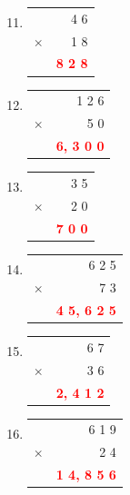 \documentclass[11pt, a4paper]{article}
\newcommand{\answerline}[1]{\textcolor{red}{\textbf{#1}}}
\begin{document}
\begin{enumerate}[label=\arabic*.]
    \setcounter{enumi}{10}
    \item \begin{tabular}[t]{c r}
          & 4 6 \\
        $\times$ & 1 8 \\ \hline
          & \answerline{8 2 8} \\ \hline
    \end{tabular}
    \hfill
    \setcounter{enumi}{15}
    \item \begin{tabular}[t]{c r}
          & 1 2 6 \\
        $\times$ & 5 0 \\ \hline
          & \answerline{6, 3 0 0} \\ \hline
    \end{tabular}

    \vspace{1.5cm}
    \setcounter{enumi}{11}
    \item \begin{tabular}[t]{c r}
          & 3 5 \\
        $\times$ & 2 0 \\ \hline
          & \answerline{7 0 0} \\ \hline
    \end{tabular}
    \hfill
    \setcounter{enumi}{16}
    \item \begin{tabular}[t]{c r}
          & 6 2 5 \\
        $\times$ & 7 3 \\ \hline
          & \answerline{4 5, 6 2 5} \\ \hline
    \end{tabular}

    \vspace{1.5cm}
    \setcounter{enumi}{12}
    \item \begin{tabular}[t]{c r}
          & 6 7 \\
        $\times$ & 3 6 \\ \hline
          & \answerline{2, 4 1 2} \\ \hline
    \end{tabular}
    \hfill
    \setcounter{enumi}{17}
    \item \begin{tabular}[t]{c r}
          & 6 1 9 \\
        $\times$ & 2 4 \\ \hline
          & \answerline{1 4, 8 5 6} \\ \hline
    \end{tabular}


\end{enumerate}
\end{document}
